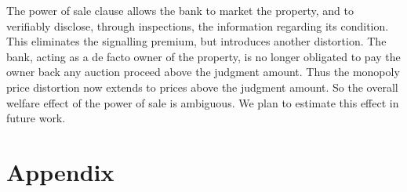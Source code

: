 \documentclass[11pt,twopage]{article}
\begin{document}
The power of sale clause allows the bank to market the property, and to verifiably disclose, through inspections, the information regarding its condition. This eliminates the signalling premium, but introduces another distortion. The bank, acting as a de facto owner of the property, is no longer obligated to pay the owner back any auction proceed above the judgment amount. Thus the monopoly price distortion now extends to prices above the judgment amount. So the overall welfare effect of the power of sale is ambiguous. We plan to estimate this effect in future work.


%
%
%

\appendix
\section*{Appendix}
\end{document}
